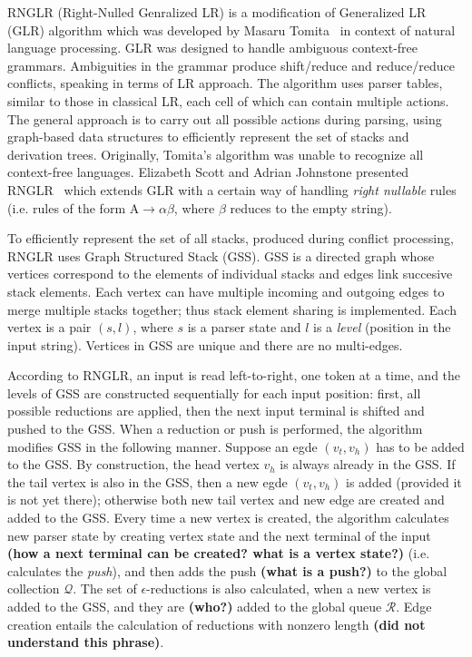 RNGLR (Right-Nulled Genralized LR) is a modification of Generalized LR (GLR) algorithm which
was developed by Masaru Tomita~\cite{Tomita} in context of natural language processing. 
GLR was designed to handle ambiguous context-free grammars. Ambiguities in the grammar produce 
shift/reduce and reduce/reduce conflicts, speaking in terms of LR approach. The algorithm 
uses parser tables, similar to those in classical LR, each cell of which can contain multiple 
actions. The general approach is to carry out all possible actions during parsing, 
using graph-based data structures to efficiently represent the set of stacks 
and derivation trees. Originally, Tomita's algorithm was unable to recognize all context-free languages.  
Elizabeth Scott and Adrian Johnstone presented RNGLR~\cite{RNGLR}
which extends GLR with a certain way of handling \emph{right nullable} 
rules (i.e. rules of the form $\mathrm{A} \rightarrow \alpha \beta$, where $\beta$ 
reduces to the empty string). 

To efficiently represent the set of all stacks, produced during conflict processing,
RNGLR uses Graph Structured Stack (GSS). GSS is a directed graph 
whose vertices correspond to the elements of individual stacks and edges link succesive
stack elements. Each vertex can have multiple incoming and outgoing edges to merge 
multiple stacks together; thus stack element sharing is implemented. Each vertex is 
a pair $(s, l)$, where $s$ is a parser state and $l$ is a \emph{level} (position in the input string). 
Vertices in GSS are unique and there are no multi-edges. 

According to RNGLR, an input is read left-to-right, one token at a time, and 
the levels of GSS are constructed sequentially for each input position: first, all  
possible reductions are applied, then the next input terminal is shifted and
pushed to the GSS. When a reduction or push is performed, 
the algorithm modifies GSS in the following manner. Suppose an 
egde $(v_t, v_h)$ has to be added to the GSS. By construction, the head vertex
$v_h$ is always already in the GSS. If the tail vertex is also in the GSS, then
a new egde $(v_t, v_h)$ is added (provided it is not yet there); otherwise both 
new tail vertex and new edge are created and added to the GSS. Every time a new 
vertex is created, the algorithm calculates new parser state by creating vertex 
state and the next terminal of the input {\bf (how a next terminal can be created? what is a vertex state?)}
(i.e. calculates the \emph{push}), and then adds the push {\bf (what is a push?)} to the global 
collection $\mathcal{Q}$. The set of $\epsilon$-reductions 
is also calculated, when a new vertex is added to the GSS, and they are {\bf (who?)} added to the 
global queue $\mathcal{R}$. Edge creation entails the calculation of reductions with 
nonzero length {\bf (did not understand this phrase)}. 

